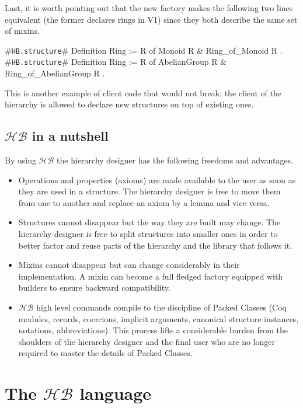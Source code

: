 \documentclass[a4paper,UKenglish,cleveref, autoref]{lipics-v2019}
\newcommand{\HB}{\ensuremath{\mathcal{HB}}}
\newcommand{\mixin}{mixin}
\newcommand{\mixins}{mixins}
\newcommand{\Mixins}{Mixins}
\newcommand{\factory}{factory}
\newcommand{\phantterms}{abbreviations}
\newcommand{\builder}{builder}
\newcommand{\hbstructure}{{\tt\color{dkgreen}HB.structure}}
\theoremstyle{implem}
\theoremstyle{implem}
\theoremstyle{command}
\theoremstyle{commands}
\begin{document}
Last, it is worth pointing out that the new \factory{} makes the following
two lines equivalent (the former declares
rings in V1) since they both describe the same set of \mixins{}.

\begin{coqcode}
#\hbstructure{}# Definition Ring := { R of Monoid R & Ring_of_Monoid R }.
#\hbstructure{}# Definition Ring := { R of AbelianGroup R & Ring_of_AbelianGroup R }.
\end{coqcode}

This is another example of client code that would not break: the client of the hierarchy is allowed to declare new
structures on top of existing ones.

\subsection{\HB{} in a nutshell}

By using \HB{} the hierarchy designer has the following freedoms and advantages.

\begin{itemize}
\item Operations and properties (axioms) are made available to the user
      as soon as they are used in a structure. The hierarchy designer
      is free to move them from one to another and replace an axiom
      by a lemma and vice versa.
\item Structures cannot disappear but the way they are built may change.
      The hierarchy designer is free to split structures into smaller
      ones in order to better factor and reuse parts of the hierarchy
      and the library that follows it.
\item \Mixins{} cannot disappear but can change considerably
      in their implementation. A \mixin{} can become a full fledged
      \factory{} equipped with \builder{}s to ensure backward compatibility.
\item \HB{} high level commands compile to
      the discipline of Packed Classes (Coq modules, records, coercions,
      implicit arguments, canonical structure instances, notations,
      \phantterms{}).
      This process lifts a considerable
      burden from the shoulders of the hierarchy designer and the final user
      who are no longer required to master the details of Packed Classes.
\end{itemize}

\section{The \HB{} language}\label{sec:language}
\end{document}
